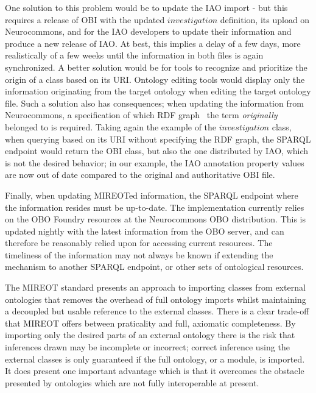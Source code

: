 \documentclass[jou]{ao2e}%
\begin{document}
One solution to this problem would be to update the \ac{IAO} import - but this requires a release of \ac{OBI} with the updated $investigation$ definition, its upload on Neurocommons, and for the \ac{IAO} developers to update their information and produce a new release of \ac{IAO}. At best, this implies a delay of a few days, more realistically of a few weeks until the information in both files is again synchronized.
A better solution would be for tools to recognize and prioritize the origin of a class based on its URI. Ontology editing tools would display only the information originating from the target ontology when editing the target ontology file.
Such a solution also has consequences; when updating the information from Neurocommons, a specification of which \ac{RDF} graph~\citep{RDF} the term \emph{originally} belonged to is required. Taking again the example of the $investigation$ class, when querying based on its URI without specifying the RDF graph, the SPARQL endpoint would return the \ac{OBI} class, but also the one distributed by \ac{IAO}, which is not the desired behavior; in our example, the \ac{IAO} annotation property values are now out of date compared to the original and authoritative \ac{OBI} file. %

Finally, when updating MIREOTed information, the SPARQL endpoint where the information resides must be up-to-date. The implementation currently relies on the \ac{OBO} Foundry resources at the Neurocommons \ac{OBO} distribution. This is updated nightly with the latest information from the \ac{OBO} server, and can therefore be reasonably relied upon for accessing current resources. The timeliness of the information may not always be known if extending the mechanism to another SPARQL endpoint, or other sets of ontological resources.

The \ac{MIREOT} standard presents an approach to importing classes from external ontologies that removes the overhead of full ontology imports whilst maintaining a decoupled but usable reference to the external classes. There is a clear trade-off that \ac{MIREOT} offers between praticality and full, axiomatic completeness. By importing only the desired parts of an external ontology there is the risk that inferences drawn may be incomplete or incorrect; correct inference using the external classes is only guaranteed if the full ontology, or a module, is imported. It does present one important advantage which is that it overcomes the obstacle presented by ontologies which are not fully interoperable at present.
\end{document}
